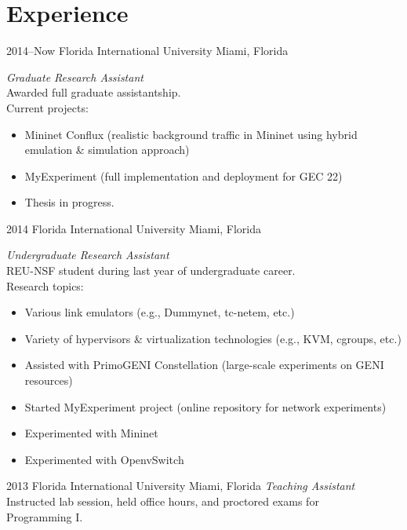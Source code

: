 \documentclass[print]{friggeri-cv} %
\begin{document}

\section{Experience}

\begin{entrylist}
\entry
{2014--Now}
{Florida International University}
{Miami, Florida}
{\emph{Graduate Research Assistant} \\
Awarded full graduate assistantship. \\
Current projects:
\begin{itemize}
    \item Mininet Conflux (realistic background traffic in Mininet using hybrid 
        \\emulation \& simulation approach)
    \item MyExperiment (full implementation and deployment for GEC 22)
    \item Thesis in progress.
\end{itemize}}
\entry
{2014}
{Florida International University}
{Miami, Florida}
{\emph{Undergraduate Research Assistant} \\
REU-NSF student during last year of undergraduate career.\\
Research topics:
\begin{itemize}
    \item Various link emulators (e.g., Dummynet, tc-netem, etc.)
    \item Variety of hypervisors \& virtualization technologies (e.g., KVM, cgroups, etc.)
    \item Assisted with PrimoGENI Constellation (large-scale experiments on GENI resources)
    \item Started MyExperiment project (online repository for network experiments)
    \item Experimented with Mininet
    \item Experimented with OpenvSwitch
\end{itemize}}
\entry
{2013}
{Florida International University}
{Miami, Florida}
{\emph{Teaching Assistant} \\
Instructed lab session, held office hours, and proctored exams for \\Programming I.}
\end{entrylist}
\end{document}
